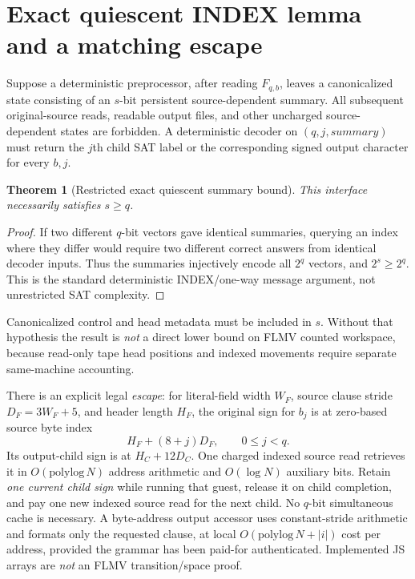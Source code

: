 \documentclass[11pt]{article}
\newtheorem{theorem}{Theorem}
\begin{document}
\section{Exact quiescent INDEX lemma and a matching escape}
Suppose a deterministic preprocessor, after reading $F_{q,b}$, leaves a canonicalized state consisting of an $s$-bit persistent source-dependent summary. All subsequent original-source reads, readable output files, and other uncharged source-dependent states are forbidden. A deterministic decoder on $(q,j,summary)$ must return the $j$th child SAT label or the corresponding signed output character for every $b,j$.
\begin{theorem}[Restricted exact quiescent summary bound]
This interface necessarily satisfies $s\ge q$.
\end{theorem}
\begin{proof}
If two different $q$-bit vectors gave identical summaries, querying an index where they differ would require two different correct answers from identical decoder inputs. Thus the summaries injectively encode all $2^q$ vectors, and $2^s\ge2^q$. This is the standard deterministic INDEX/one-way message argument, not unrestricted SAT complexity.
\end{proof}
Canonicalized control and head metadata must be included in $s$. Without that hypothesis the result is \emph{not} a direct lower bound on FLMV counted workspace, because read-only tape head positions and indexed movements require separate same-machine accounting.

There is an explicit legal \emph{escape}: for literal-field width $W_F$, source clause stride $D_F=3W_F+5$, and header length $H_F$, the original sign for $b_j$ is at zero-based source byte index
\[
H_F+(8+j)D_F,\qquad 0\le j<q.
\]
Its output-child sign is at $H_C+12D_C$. One charged indexed source read retrieves it in $O(\mathrm{polylog}\,N)$ address arithmetic and $O(\log N)$ auxiliary bits. Retain \emph{one current child sign} while running that guest, release it on child completion, and pay one new indexed source read for the next child. No $q$-bit simultaneous cache is necessary. A byte-address output accessor uses constant-stride arithmetic and formats only the requested clause, at local $O(\mathrm{polylog}\,N+|i|)$ cost per address, provided the grammar has been paid-for authenticated. Implemented JS arrays are \emph{not} an FLMV transition/space proof.
\end{document}
